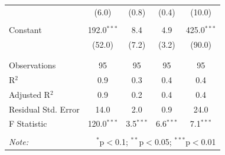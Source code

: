 \documentclass[12pt, a4paper]{article}
\begin{document}
\begin{table}[!htbp]
\begin{tabular}{@{\extracolsep{5pt}}lcccc}
  & (6.0) & (0.8) & (0.4) & (10.0) \\ 
  & & & & \\ 
 Constant & 192.0$^{***}$ & 8.4 & 4.9 & 425.0$^{***}$ \\ 
  & (52.0) & (7.2) & (3.2) & (90.0) \\ 
  & & & & \\ 
\hline \\[-1.8ex] 
Observations & 95 & 95 & 95 & 95 \\ 
R$^{2}$ & 0.9 & 0.3 & 0.4 & 0.4 \\ 
Adjusted R$^{2}$ & 0.9 & 0.2 & 0.4 & 0.4 \\ 
Residual Std. Error & 14.0 & 2.0 & 0.9 & 24.0 \\ 
F Statistic & 120.0$^{***}$ & 3.5$^{***}$ & 6.6$^{***}$ & 7.1$^{***}$ \\ 
\hline 
\hline \\[-1.8ex] 
\textit{Note:}  & \multicolumn{4}{r}{$^{*}$p$<$0.1; $^{**}$p$<$0.05; $^{***}$p$<$0.01} \\ 
\end{tabular} 
\end{table} 
\end{document}
